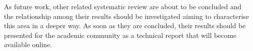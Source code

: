  As future work, other related systematic review are about to be concluded and the relationship among their results should be investigated aiming to characterise this area in a deeper way. As soon as they are concluded, their results should be presented for the academic community as a technical report that will become available online.











